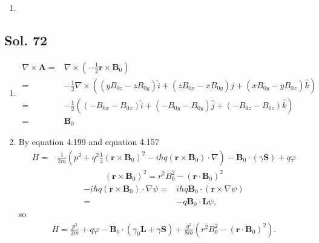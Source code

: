 \begin{enumerate}
\begin{align*}
         \frac{1}{\sqrt{32\pi a^3}}\frac{r\sin\theta\sin\phi}{a}\exp(-\frac{r}{2a})\\
         =&-i\hbar\frac{1}{\sqrt{32\pi a^3}}\frac{r}{a}\exp(-\frac{r}{2a})
         (\cos\phi\cos\theta\sin\phi-\sin\phi\cot\theta\sin\theta\cos\phi)\\
         =&0
     \end{align*}
     \begin{align*}
         L_z\psi_{2p_z}=&
         -i\hbar\frac{\partial}{\partial\phi}
         \frac{1}{\sqrt{32\pi a^3}}\frac{r\cos\theta}{a}\exp(-\frac{r}{2a})\\
         =&0
     \end{align*}
     \item 
 \end{enumerate}
 \subsection*{Sol. 72}
 \begin{enumerate}
     \item 
     \begin{align*}
         \nabla\times\bm A =&
         \nabla\times(-\frac{1}{2}\bm r \times \bm B_0)\\
         = &
         -\frac{1}{2}\nabla\times
         ((yB_{0z}-zB_{0y})\hat i+
         (zB_{0x}-xB_{0y})\hat j +
         (xB_{0y}-yB_{0x})\hat k)\\
         =&
         -\frac{1}{2}
         ((-B_{0x}-B_{0x})\hat i +
         (-B_{0y}-B_{0y})\hat j +
         (-B_{0z}-B_{0z})\hat k)\\
         =&\bm B_0
     \end{align*}
     \item By equation 4.199 and equation 4.157
     \begin{align*}
         H =& \frac{1}{2m}
         (p^2+q^2\frac{1}{4}(\bm r\times \bm B_0)^2
         -i\hbar q(\bm r\times \bm B_0)\cdot\nabla)-\bm B_0\cdot(\gamma\bm S)+q\varphi
     \end{align*}
     \begin{align*}
         (\bm r\times \bm B_0)^2
         =r^2B_0^2-(\bm r\cdot \bm B_0)^2
     \end{align*}
     \begin{align*}
         -i\hbar q(\bm r\times \bm B_0)\cdot \nabla\psi
         =&i\hbar q\bm B_0\cdot (\bm r\times \nabla\psi)\\
         =&-q\bm B_0\cdot \bm L\psi,
     \end{align*}
     so 
     \begin{align*}
         H = 
         \frac{p^2}{2m}
         +q\varphi 
         -\bm B_0\cdot
         (\gamma_0\bm L+\gamma \bm S)
         +
         \frac{q^2}{8m}
         (r^2B_0^2-(\bm r\cdot \bm B_0)^2).
     \end{align*}
     
 \end{enumerate}
